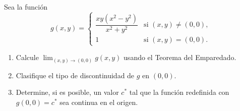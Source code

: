 Sea la función
\[
g(x,y) =
\begin{cases}
    \dfrac{xy(x^2 - y^2)}{x^2 + y^2} & \text{si } (x,y) \neq (0,0), \\[8pt]
    1 & \text{si } (x,y) = (0,0).
\end{cases}
\]
\begin{enumerate}
    \item Calcule $\displaystyle\lim_{(x,y)\to(0,0)} g(x,y)$ usando el Teorema del Emparedado.
    \item Clasifique el tipo de discontinuidad de $g$ en $(0,0)$.
    \item Determine, si es posible, un valor $c^*$ tal que la función redefinida con $g(0,0)=c^*$ sea continua en el origen.
\end{enumerate}
